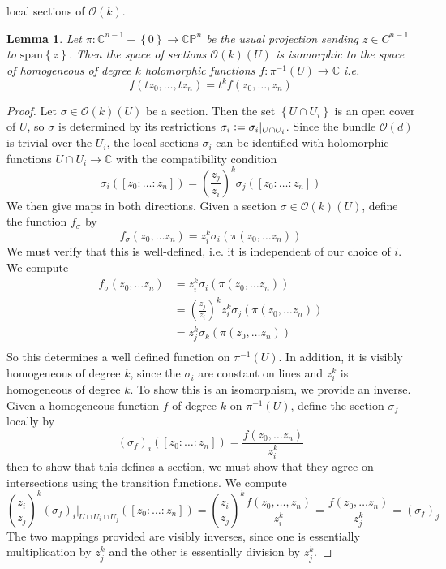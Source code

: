 \documentclass[psamsfonts, 12pt]{amsart}
\newtheorem{lem}[thm]{Lemma}
\theoremstyle{definition}
\theoremstyle{remark}
\renewcommand{\O}{\mathcal{O}}
\renewcommand{\C}{\mathbb{C}}
\newcommand{\CP}{\mathbb{CP}}
\newcommand{\inv}{^{-1}}
\newcommand{\set}[1]{\left\lbrace #1 \right\rbrace}
\newcommand{\defeq}{\vcentcolon=}
\begin{document}
local sections of $\O(k)$.
%
\begin{lem}
Let $\pi : \C^{n-1} - \set{0} \to \CP^n$ be the usual projection sending
$z \in C^{n-1}$ to $\mathrm{span}\set{z}$. Then the space of sections
$\O(k)(U)$ is isomorphic to the space of homogeneous of degree $k$  holomorphic functions
$f : \pi\inv(U) \to \C$ i.e.
\[
f(tz_0, \ldots, tz_n) = t^kf(z_0,\ldots, z_n)
\]
\end{lem}
%
\begin{proof}
Let $\sigma \in \O(k)(U)$ be a section. Then the set $\set{U \cap U_i}$ is an
open cover of $U$, so $\sigma$ is determined by its restrictions
$\sigma_i \defeq \sigma_i\vert_{U \cap U_i}$. Since the bundle $\O(d)$ is trivial
over the $U_i$, the local sections $\sigma_i$ can be identified with holomorphic
functions $U \cap U_i \to \C$ with the compatibility condition
\[
\sigma_i([z_0 :\ldots : z_n])
= \left(\frac{z_j}{z_i}\right)^k\sigma_j([z_0: \ldots : z_n])
\]
We then give maps in both directions. Given a section
$\sigma \in \O(k)(U)$, define the function $f_\sigma$ by
\[
f_\sigma(z_0,\ldots z_n) = z_i^k\sigma_i(\pi(z_0,\ldots z_n))
\]
We must verify that this is well-defined, i.e. it is independent of our choice of $i$.
We compute
\begin{align*}
f_\sigma(z_0,\ldots z_n)
&=  z_i^k\sigma_i(\pi(z_0,\ldots z_n)) \\
&=  \left(\frac{z_j}{z_i}\right)^kz_i^k\sigma_j(\pi(z_0,\ldots z_n)) \\
&= z_j^k\sigma_k(\pi(z_0, \ldots z_n)) \\
\end{align*}
So this determines a well defined function on $\pi\inv(U)$. In addition, it is
visibly homogeneous of degree $k$, since the $\sigma_i$ are constant on lines and
$z_i^k$ is homogeneous of degree $k$. To show this is an isomorphism, we provide
an inverse. Given a homogeneous function $f$ of degree $k$ on $\pi\inv(U)$, define
the section $\sigma_f$ locally by
\[
(\sigma_f)_i([z_0: \ldots :z_n]) = \frac{f(z_0,\ldots z_n)}{z_i^k}
\]
then to show that this defines a section, we must show that they agree on intersections
using the transition functions. We compute
\[
\left(\frac{z_i}{z_j}\right)^k(\sigma_f)_i\vert_{U \cap U_i \cap U_j}([z_0: \ldots : z_n])
= \left(\frac{z_i}{z_j}\right)^k\frac{f(z_0,\ldots, z_n)}{z_i^k}
= \frac{f(z_0, \ldots z_n)}{z_j^k}
= (\sigma_f)_j
\]
The two mappings provided are visibly inverses, since one is essentially multiplication
by $z_j^k$ and the other is essentially division by $z_j^k$.
\end{proof}
\end{document}

